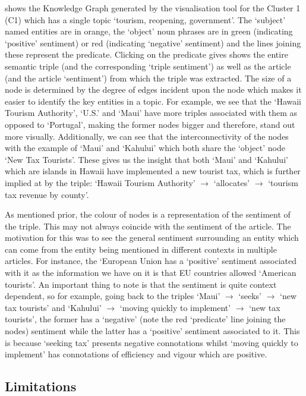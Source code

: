  shows the Knowledge Graph generated by the visualisation tool for the Cluster 1 (C1) which has a single topic `tourism, reopening, government'. The `subject' named entities are in orange, the `object' noun phrases are in green (indicating `positive' sentiment) or red (indicating `negative' sentiment) and the lines joining these represent the predicate. Clicking on the predicate gives shows the entire semantic triple (and the corresponding `triple sentiment') as well as the article (and the article `sentiment') from which the triple was extracted. The size of a node is determined by the degree of edges incident upon the node which makes it easier to identify the key entities in a topic. For example, we see that the `Hawaii Tourism Authority', `U.S.' and `Maui' have more triples associated with them as opposed to `Portugal', making the former nodes bigger and therefore,  stand out more visually. Additionally, we can see that the interconnectivity of the nodes with the example of `Maui' and `Kahului' which both share the `object' node `New Tax Tourists'. These gives us the insight that both `Maui' and `Kahului' which are islands in Hawaii have implemented a new tourist tax, which is further implied at by the triple: `Hawaii Tourism Authority' $\rightarrow$ `allocates'  $\rightarrow$ `tourism tax revenue by county'.

As mentioned prior, the colour of nodes is a representation of the sentiment of the triple. This may not always coincide with the sentiment of the article. The motivation for this was to see the general sentiment surrounding an entity which can come from the entity being mentioned in different contexts in multiple articles. For instance, the `European Union has a `positive' sentiment associated with it as the information we have on it is that EU countries allowed `American tourists'. An important thing to note is that the sentiment is quite context dependent, so for example, going back to the triples `Maui' $\rightarrow$ `seeks'  $\rightarrow$ `new tax tourists' and `Kahului' $\rightarrow$ `moving quickly to implement' $\rightarrow$ `new tax tourists', the former has a `negative' (note the red `predicate' line joining the nodes) sentiment while the latter has a `positive' sentiment associated to it. This is because `seeking tax' presents negative connotations whilst `moving quickly to implement' has connotations of efficiency and vigour which are positive.


\subsection*{Limitations}

